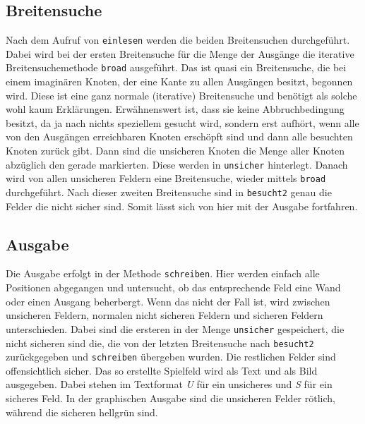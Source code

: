 \documentclass[12pt]{article}
\begin{document}
\subsection{Breitensuche}
Nach dem Aufruf von \texttt{einlesen} werden die beiden Breitensuchen durchgeführt. Dabei wird bei der ersten Breitensuche für die Menge der Ausgänge die iterative Breitensuchemethode \texttt{broad} ausgeführt. Das ist quasi ein Breitensuche, die bei einem imaginären Knoten, der eine Kante zu allen Ausgängen besitzt, begonnen wird. Diese ist eine ganz normale (iterative) Breitensuche und benötigt als solche wohl kaum Erklärungen. Erwähnenswert ist, dass sie keine Abbruchbedingung besitzt, da ja nach nichts speziellem gesucht wird, sondern erst aufhört, wenn alle von den Ausgängen erreichbaren Knoten erschöpft sind und dann alle besuchten Knoten zurück gibt. Dann sind die unsicheren Knoten die Menge aller Knoten abzüglich den gerade markierten. Diese werden in \texttt{unsicher} hinterlegt. Danach wird von allen unsicheren Feldern eine Breitensuche, wieder mittels \texttt{broad} durchgeführt. Nach dieser zweiten Breitensuche sind in \texttt{besucht2} genau die Felder die nicht sicher sind. Somit lässt sich von hier mit der Ausgabe fortfahren.

\subsection{Ausgabe}

Die Ausgabe erfolgt in der Methode \texttt{schreiben}. Hier werden einfach alle Positionen abgegangen und untersucht, ob das entsprechende Feld eine Wand oder einen Ausgang beherbergt. Wenn das nicht der Fall ist, wird zwischen unsicheren Feldern, normalen nicht sicheren Feldern und sicheren Feldern unterschieden. Dabei sind die ersteren in der Menge \texttt{unsicher} gespeichert, die nicht sicheren sind die, die von der letzten Breitensuche nach \texttt{besucht2} zurückgegeben und \texttt{schreiben} übergeben wurden. Die restlichen Felder sind offensichtlich sicher. Das so erstellte Spielfeld wird als Text und als Bild ausgegeben. Dabei stehen im Textformat \textit{U} für ein unsicheres und \textit{S} für ein sicheres Feld. In der graphischen Ausgabe sind die unsicheren Felder rötlich, während die sicheren hellgrün sind. 
\end{document}
